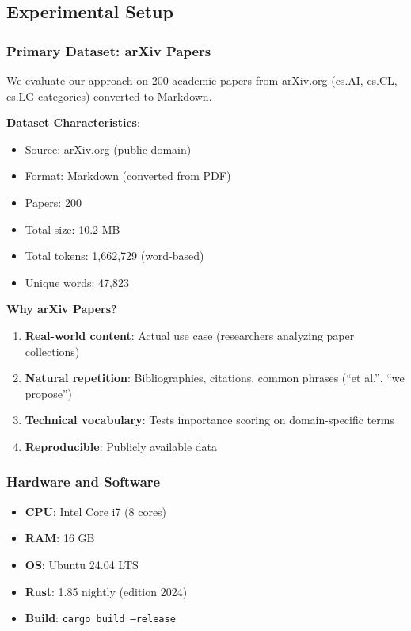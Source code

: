 \label{sec:benchmarks}

\subsection{Experimental Setup}

\subsubsection{Primary Dataset: arXiv Papers}

We evaluate our approach on 200 academic papers from arXiv.org (cs.AI, cs.CL, cs.LG categories) converted to Markdown.

\textbf{Dataset Characteristics}:
\begin{itemize}
    \item Source: arXiv.org (public domain)
    \item Format: Markdown (converted from PDF)
    \item Papers: 200
    \item Total size: 10.2 MB
    \item Total tokens: 1,662,729 (word-based)
    \item Unique words: 47,823
\end{itemize}

\textbf{Why arXiv Papers?}
\begin{enumerate}
    \item \textbf{Real-world content}: Actual use case (researchers analyzing paper collections)
    \item \textbf{Natural repetition}: Bibliographies, citations, common phrases (``et al.'', ``we propose'')
    \item \textbf{Technical vocabulary}: Tests importance scoring on domain-specific terms
    \item \textbf{Reproducible}: Publicly available data
\end{enumerate}

\subsubsection{Hardware and Software}

\begin{itemize}
    \item \textbf{CPU}: Intel Core i7 (8 cores)
    \item \textbf{RAM}: 16 GB
    \item \textbf{OS}: Ubuntu 24.04 LTS
    \item \textbf{Rust}: 1.85 nightly (edition 2024)
    \item \textbf{Build}: \texttt{cargo build --release}
\end{itemize}

